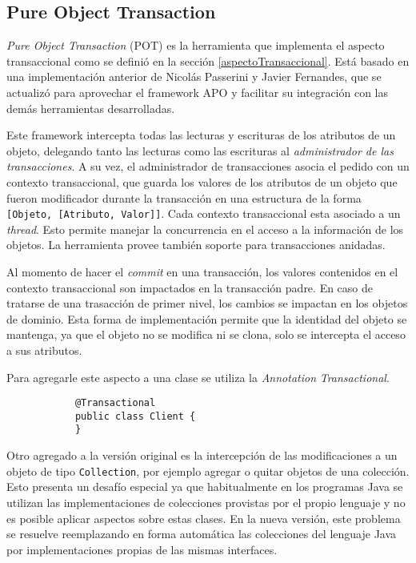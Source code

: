 \subsection{Pure Object Transaction}
	\label{pot} 
	\emph{Pure Object Transaction} (POT) es la herramienta que implementa el
	aspecto transaccional como se definió en la sección \ref{aspectoTransaccional}.
	Está basado en una implementación anterior de Nicolás Passerini y Javier
	Fernandes, que se actualizó para aprovechar el framework APO y facilitar su
	integración con las demás herramientas desarrolladas.
	
	\medskip
	 
	Este framework intercepta todas las lecturas y escrituras de los atributos de
	un objeto, delegando tanto las lecturas como las escrituras al
	\emph{administrador de las transacciones}.
	A su vez, el administrador de transacciones asocia el pedido con un contexto
	transaccional, que guarda los valores de los atributos de un objeto que fueron
	modificador durante la transacción en una estructura de la forma
	\lstinline|[Objeto, [Atributo, Valor]]|.
	Cada contexto transaccional esta asociado a un \emph{thread}. Esto
	permite manejar la concurrencia en el acceso a la información de los objetos.
	La herramienta provee también soporte para transacciones anidadas.
	 
	Al momento de hacer el \emph{commit} en una transacción, los valores
	contenidos en el contexto transaccional son impactados en la transacción
	padre.
	En caso de tratarse de una trasacción de primer nivel, los cambios se impactan
	en los objetos de dominio.
	Esta forma de implementación permite que la identidad del objeto se
	mantenga, ya que el objeto no se modifica ni se clona, solo se intercepta el
	acceso a sus atributos.
	
	Para agregarle este aspecto a una clase se utiliza la \emph{Annotation}
	\emph{Transactional}.
			
		\begin{lstlisting} 
			@Transactional
			public class Client {
			}
		\end{lstlisting}
	
	\medskip
	
	Otro agregado a la versión original es la intercepción de las modificaciones 
	a un objeto de tipo \lstinline|Collection|, por ejemplo agregar o quitar
	objetos de una colección.
	Esto presenta un desafío especial ya que habitualmente en los programas Java
	se utilizan las implementaciones de colecciones provistas por el propio
	lenguaje y no es posible aplicar aspectos sobre estas clases. 
	En la nueva versión, este problema se resuelve reemplazando en forma
	automática las colecciones del lenguaje Java por
	implementaciones propias de las mismas interfaces.

